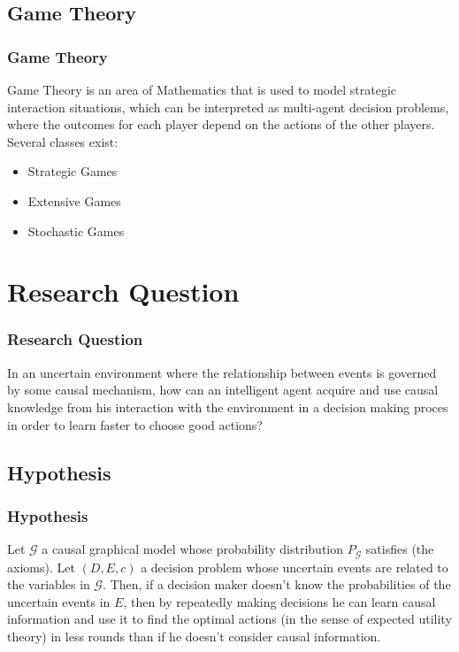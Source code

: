 \documentclass{beamer}
\theoremstyle{plain}
\begin{document}
	\subsection{Game Theory}
\begin{frame}
\frametitle{Game Theory}
Game Theory is an area of Mathematics that is used to model strategic interaction situations, which can be interpreted as multi-agent decision problems, where the outcomes for each player depend on the actions of the other players. Several classes exist:
\begin{itemize}
\item Strategic Games
\item Extensive Games
\item Stochastic Games
\end{itemize}
\end{frame}
\section{Research Question}
\begin{frame}
\frametitle{Research Question}
In an uncertain environment where the relationship between events is governed by some causal mechanism, how can an intelligent agent acquire and use causal knowledge from his interaction with the environment in a decision making proces in order to learn faster to choose good actions?
\end{frame}

	\subsection{Hypothesis}
	\begin{frame}
	\frametitle{Hypothesis}
Let $\mathcal{G}$ a causal graphical model whose probability distribution $P_\mathcal{G}$ satisfies (the axioms). Let $(D,E,c)$ a decision problem whose uncertain events are related to the variables in $\mathcal{G}$. Then, if a decision maker doesn't know the probabilities of the uncertain events in $E$, then by repeatedly making decisions he can learn causal information and use it to find the optimal actions (in the sense of expected utility theory) in less rounds than if he doesn't consider causal information.
	\end{frame}
\end{document}
